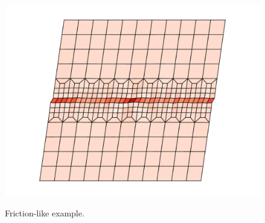 \documentclass[fleqn]{goose-article}
\begin{document}
\begin{figure}[htp]
    \hfill
    \begin{minipage}[t]{.3\textwidth}
        \centering
        \includegraphics[width=\textwidth]{example_end.pdf}
        \label{fig:example:end}
    \end{minipage}
    \hfill
    \caption{Friction-like example.}
    \label{fig:}
\end{figure}
{}
\end{document}

